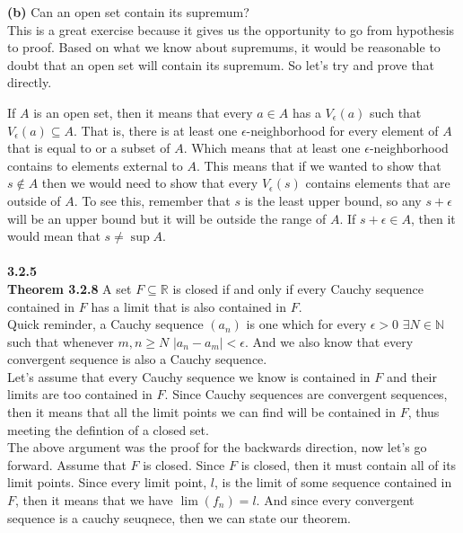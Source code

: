 \textbf{(b)} Can an open set contain its supremum?
\\

This is a great exercise because it gives us the opportunity to go from hypothesis to proof.
Based on what we know about supremums, it would be reasonable to doubt that an open set will contain its supremum.
So let's try and prove that directly.

If $A$ is an open set, then it means that every $a \in A$ has a $V_\epsilon (a)$ such that $V_{\epsilon} (a) \subseteq A$.
That is, there is at least one $\epsilon$-neighborhood for every element of $A$ that is equal to or a subset of $A$.
Which means that at least one $\epsilon$-neighborhood contains to elements external to $A$.
This means that if we wanted to show that $s \not\in A$ then we would need to show that every $V_\epsilon (s)$
contains elements that are outside of $A$.
To see this, remember that $s$ is the least upper bound, so any $s+\epsilon$ will be an upper bound but it will be
outside the range of $A$.
If $s+\epsilon \in A$, then it would mean that $s \neq \sup A$.
\\~\\




\textbf{3.2.5}
\\

\textbf{Theorem 3.2.8} A set $F \subseteq \mathbb{R}$ is closed if and only if every
Cauchy sequence contained in $F$ has a limit that is also contained in $F$.
\\

Quick reminder, a Cauchy sequence $(a_n)$ is one which for every $\epsilon >0$
$\exists N\in\mathbb{N}$ such that whenever $m,n \geq N$ $|a_n - a_m| < \epsilon$.
And we also know that every convergent sequence is also a Cauchy sequence.
\\

Let's assume that every Cauchy sequence we know is contained in $F$ and their limits are too contained in $F$.
Since Cauchy sequences are convergent sequences, then it means that all the limit points we can find
will be contained in $F$, thus meeting the defintion of a closed set.
\\

The above argument was the proof for the backwards direction, now let's go forward.
Assume that $F$ is closed.
Since $F$ is closed, then it must contain all of its limit points.
Since every limit point, $l$, is the limit of some sequence contained in $F$, then it means that we have
$\lim (f_n) = l$.
And since every convergent sequence is a cauchy seuqnece, then we can state our theorem.
\\~\\



